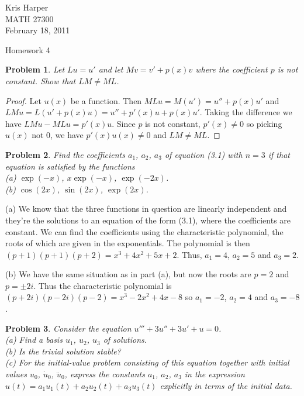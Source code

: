\documentclass{article}
\newtheorem{problem}{Problem}
\begin{document}
\begin{flushright}
Kris Harper\\

MATH 27300\\

February 18, 2011
\end{flushright}

\begin{center}
Homework 4
\end{center}

\begin{problem}
Let $Lu = u'$ and let $Mv = v' + p(x)v$ where the coefficient $p$ is not constant. Show that $LM \neq ML$.
\end{problem}
\begin{proof}
Let $u(x)$ be a function. Then $MLu = M(u') = u'' + p(x)u'$ and $LMu = L(u' + p(x)u) = u'' + p'(x)u + p(x)u'$. Taking the difference we have $LMu - MLu = p'(x)u$. Since $p$ is not constant, $p'(x) \neq 0$ so picking $u(x)$ not $0$, we have $p'(x)u(x) \neq 0$ and $LM \neq ML$.
\end{proof}

\begin{problem}
Find the coefficients $a_1$, $a_2$, $a_3$ of equation (3.1) with $n = 3$ if that equation is satisfied by the functions\\
(a) $\exp(-x)$, $x \exp(-x)$, $\exp(-2x)$.\\
(b) $\cos(2x)$, $\sin(2x)$, $\exp(2x)$.
\end{problem}

(a) We know that the three functions in question are linearly independent and they're the solutions to an equation of the form (3.1), where the coefficients are constant. We can find the coefficients using the characteristic polynomial, the roots of which are given in the exponentials. The polynomial is then $(p+1)(p+1)(p+2) = x^3 + 4x^2 + 5x + 2$. Thus, $a_1 = 4$, $a_2 = 5$ and $a_3 = 2$.

(b) We have the same situation as in part (a), but now the roots are $p = 2$ and  $p = \pm 2i$. Thus the characteristic polynomial is $(p+2i)(p-2i)(p-2) = x^3 - 2x^2 + 4x - 8$ so $a_1 = -2$, $a_2 = 4$ and $a_3 = -8$.

\begin{problem}
Consider the equation $u''' + 3u'' + 3u' + u = 0$.\\
(a) Find a basis $u_1$, $u_2$, $u_3$ of solutions.\\
(b) Is the trivial solution stable?\\
(c) For the initial-value problem consisting of this equation together with initial values $u_0$, $\dot{u}_0$, $\ddot{u}_0$, express the constants $a_1$, $a_2$, $a_3$ in the expression $u(t) = a_1u_1(t) + a_2u_2(t) + a_3u_3(t)$ explicitly in terms of the initial data.
\end{problem}
\end{document}
